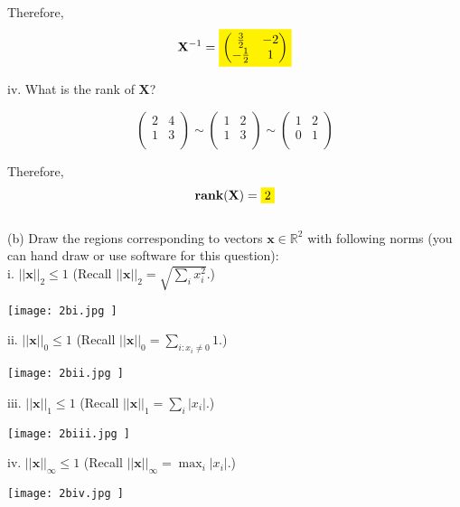 \documentclass[12pt]{article}
\begin{document}
Therefore,
$$\mathbf{X}^{-1} = \colorbox{yellow}{$\begin{pmatrix} \frac{3}{2} & -2\\ -\frac{1}{2} & 1\\ \end{pmatrix}$}$$

iv. What is the rank of $\mathbf{X}$?

$$\begin{pmatrix}  2 & 4 \\ 1 & 3 \\ \end{pmatrix} \sim \begin{pmatrix}  1 & 2 \\ 1 & 3 \\ \end{pmatrix} \sim \begin{pmatrix}  1 & 2 \\ 0 & 1 \\ \end{pmatrix}$$

Therefore,
$$\textbf{rank} (\mathbf{X}) = \colorbox{yellow}{2}$$\\

\noindent (b) Draw the regions corresponding to vectors $\mathbf{x} \in \mathbb{R}^2$ with following norms (you can hand draw or use software for this question):\\

i. $||\mathbf{x}||_2 \leq 1$ (Recall $||\mathbf{x}||_2 = \sqrt{\sum_i x_i^2}$.)
\begin{center}
\texttt{[image:  2bi.jpg ]}
\end{center}

ii. $||\mathbf{x}||_0 \leq 1$ (Recall $||\mathbf{x}||_0 = \sum_{i:x_i \neq 0}  1$.)
\begin{center}
\texttt{[image:  2bii.jpg ]}
\end{center}

iii. $||\mathbf{x}||_1 \leq 1$ (Recall $||\mathbf{x}||_1 = \sum_i |x_i|$.)
\begin{center}
\texttt{[image:  2biii.jpg ]}
\end{center}

iv. $||\mathbf{x}||_\infty \leq 1$ (Recall $||\mathbf{x}||_\infty = \max_i |x_i|$.)
\begin{center}
\texttt{[image:  2biv.jpg ]}
\end{center}
\vspace{1em}
\end{document}

